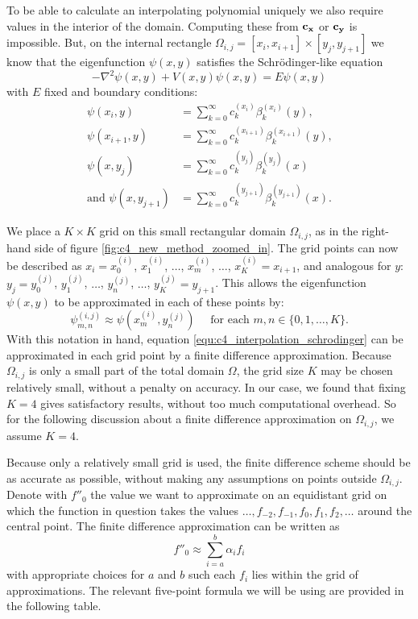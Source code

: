 To be able to calculate an interpolating polynomial uniquely we also require values in the interior of the domain. Computing these from $\vb{c_x}$ or $\vb{c_y}$ is impossible. But, on the internal rectangle $\Omega_{i, j} = [x_i, x_{i+1}] \times [y_j, y_{j+1}]$ we know that the eigenfunction $\psi(x, y)$ satisfies the Schrödinger-like equation
\begin{equation}\label{equ:c4_interpolation_schrodinger}
    -\nabla^2 \psi(x, y) + V(x, y) \psi(x, y) = E \psi(x, y)
\end{equation}
with $E$ fixed and boundary conditions:
\begin{align*}
    \psi(x_i, y)                 & = \sum_{k=0}^\infty c_k^{(x_i)} \beta_k^{(x_i)}(y)\text{,}          \\
    \psi(x_{i+1}, y)             & = \sum_{k=0}^\infty c_k^{(x_{i+1})} \beta_k^{(x_{i+1})}(y)\text{,}  \\
    \psi(x, y_j)                 & = \sum_{k=0}^\infty c_k^{(y_j)} \beta_k^{(y_j)}(x)                  \\
    \text{and } \psi(x, y_{j+1}) & = \sum_{k=0}^\infty c_k^{(y_{j+1})} \beta_k^{(y_{j+1})}(x) \text{.}
\end{align*}

We place a $K \times K$ grid on this small rectangular domain $\Omega_{i, j}$, as in the right-hand side of figure \ref{fig:c4_new_method_zoomed_in}. The grid points can now be described as $x_i = x^{(i)}_0$, $x^{(i)}_1$, $\dots$, $x^{(i)}_m$, $\dots$, $x^{(i)}_K = x_{i+1}$, and analogous for $y$: $y_j = y^{(j)}_0$, $y^{(j)}_1$, $\dots$, $y^{(j)}_n$, $\dots$, $y^{(j)}_K = y_{j+1}$. This allows the eigenfunction $\psi(x, y)$ to be approximated in each of these points by:
$$
    \psi^{(i,j)}_{m,n} \approx \psi(x^{(i)}_m, y^{(j)}_n) \quad \text{ for each $m, n \in \{0, 1, \dots, K\}$.}
$$
With this notation in hand, equation \ref{equ:c4_interpolation_schrodinger} can be approximated in each grid point by a finite difference approximation. Because $\Omega_{i,j}$ is only a small part of the total domain $\Omega$, the grid size $K$ may be chosen relatively small, without a penalty on accuracy. In our case, we found that fixing $K = 4$ gives satisfactory results, without too much computational overhead. So for the following discussion about a finite difference approximation on $\Omega_{i,j}$, we assume $K = 4$.

Because only a relatively small grid is used, the finite difference scheme should be as accurate as possible, without making any assumptions on points outside $\Omega_{i,j}$. Denote with $f''_0$ the value we want to approximate on an equidistant grid on which the function in question takes the values $\dots, f_{-2}, f_{-1}, f_{0}, f_{1}, f_{2}, \dots$ around the central point. The finite difference approximation can be written as
$$
    f''_0 \approx \sum_{i = a}^{b} \alpha_i f_i
$$
with appropriate choices for $a$ and $b$ such each $f_i$ lies within the grid of approximations. The relevant five-point formula we will be using are provided in the following table.

